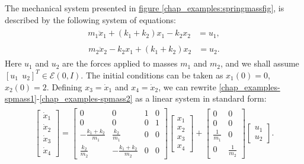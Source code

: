 \documentclass[letterpaper,10pt,english]{sphinxmanual}
\begin{document}
The mechanical system presented in \hyperref[chap_examples:springmassfig]{figure  \ref*{chap_examples:springmassfig}}, is described
by the following system of equations:
\label{chap_examples:equation-spmass1}\begin{gather}
\begin{split}m_1\ddot{x}_1+(k_1+k_2)x_1-k_2x_2 & = u_1,\end{split}\label{chap_examples-spmass1}
\end{gather}\label{chap_examples:equation-spmass2}\begin{gather}
\begin{split}m_2\ddot{x}_2-k_2x_1+(k_1+k_2)x_2 & = u_2 .\end{split}\label{chap_examples-spmass2}
\end{gather}
Here \(u_1\) and \(u_2\) are the forces applied to masses
\(m_1\) and \(m_2\), and we shall assume
\([u_1 ~~ u_2]^T\in{\mathcal E}(0,I)\). The initial conditions can
be taken as \(x_1(0)=0\), \(x_2(0)=2\). Defining
\(x_3=\dot{x}_1\) and \(x_4=\dot{x}_2\), we can rewrite
\eqref{chap_examples-spmass1}-\eqref{chap_examples-spmass2} as a linear system in standard form:
\label{chap_examples:equation-spmassls}\begin{gather}
\begin{split}\left[\begin{array}{c}
\dot{x}_1 \\
\dot{x}_2 \\
\dot{x}_3 \\
\dot{x}_4 \end{array}\right] = \left[\begin{array}{cccc}
0 & 0 & 1 & 0\\
0 & 0 & 0 & 1\\
-\frac{k_1+k_2}{m_1} & \frac{k_2}{m_1} & 0 & 0\\
\frac{k_2}{m_2} & -\frac{k_1+k_2}{m_2} & 0 & 0\end{array}\right]
\left[\begin{array}{c}
x_1 \\
x_2 \\
x_3 \\
x_4 \end{array}\right] + \left[\begin{array}{cc}
0 & 0\\
0 & 0\\
\frac{1}{m_1} & 0\\
0 & \frac{1}{m_2}\end{array}\right]\left[\begin{array}{c}
u_1\\
u_2\end{array}\right].\end{split}\label{chap_examples-spmassls}
\end{gather}
\end{document}
